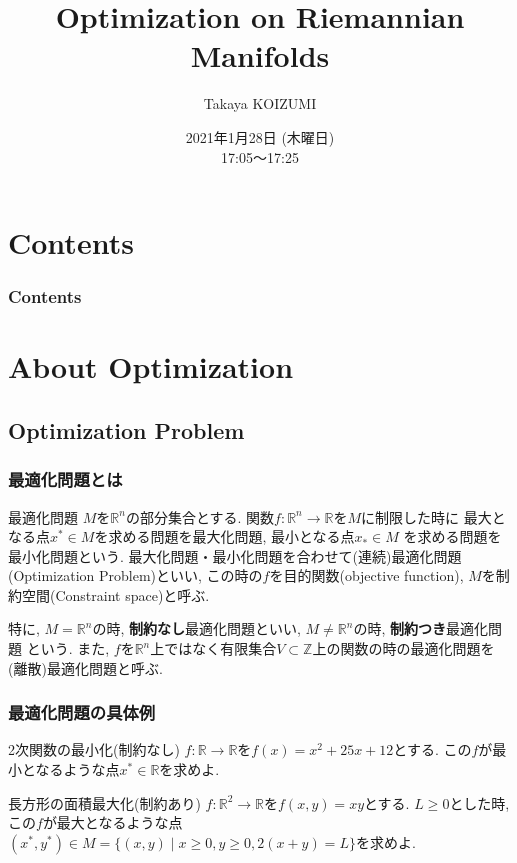 \documentclass[dvipdfmx,11pt]{beamer}		%
\title{Optimization on Riemannian Manifolds}
\author{Takaya KOIZUMI}
\institute{Department of Mathematical Science\\B4}
\date{2021年1月28日 (木曜日)\\ 17:05～17:25}
\newcommand{\R}{\mathbb{R}}
\newcommand{\Z}{\mathbb{Z}}
\begin{document}
    \begin{frame}\frametitle{}
        \titlepage
    \end{frame}
    \section*{Contents}
    \begin{frame}\frametitle{Contents}
        \tableofcontents
    \end{frame}
\section{About Optimization}
    \subsection{Optimization Problem}
    \begin{frame}
        \frametitle{最適化問題とは}
        \begin{block}{最適化問題}
            $M$を$\R^n$の部分集合とする. 関数$f : \R^n\to\R$を$M$に制限した時に
            最大となる点$x^*\in M$を求める問題を最大化問題, 最小となる点$x_*\in M$
            を求める問題を最小化問題という. 最大化問題・最小化問題を合わせて(連続)最適化問題(Optimization Problem)といい, 
            この時の$f$を目的関数(objective function), $M$を制約空間(Constraint space)と呼ぶ. 
        \end{block}
        特に, $M = \R^n$の時, \textbf{制約なし}最適化問題といい, $M\neq\R^n$の時, \textbf{制約つき}最適化問題
        という. また, $f$を$\R^n$上ではなく有限集合$V\subset\Z$上の関数の時の最適化問題を 
        (離散)最適化問題と呼ぶ. 
    \end{frame}
    \begin{frame}
        \frametitle{最適化問題の具体例}
        \begin{exampleblock}{2次関数の最小化(制約なし)}
            $f : \R\to\R$を$f(x) = x^2 + 25x + 12$とする. 
            この$f$が最小となるような点$x^*\in\R$を求めよ.
        \end{exampleblock}
        \begin{exampleblock}{長方形の面積最大化(制約あり)}
            $f : \R^2\to\R$を$f(x, y) = xy$とする. $L\geq 0$とした時, 
            この$f$が最大となるような点$(x^*, y^*)\in M = \{(x, y)\mid x\geq 0, y\geq0, 2(x + y) = L\}$を求めよ.
        \end{exampleblock}        
    \end{frame}
\end{document}

